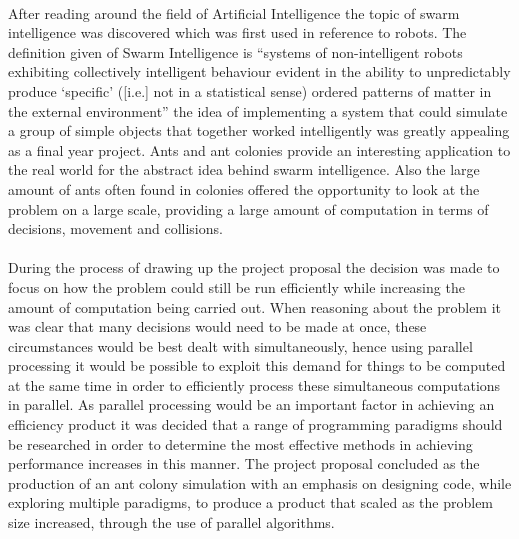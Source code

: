 \documentclass[main.tex]{subfiles}
\begin{document}
\paragraph{}After reading around the field of Artificial Intelligence the topic of swarm intelligence was discovered which was first used in reference to robots. The definition given of Swarm Intelligence is ``systems of non-intelligent robots exhibiting collectively intelligent behaviour evident in the ability to unpredictably produce `specific' ([i.e.] not in a statistical sense) ordered patterns of matter in the external environment''\cite{Beni1989} the idea of implementing a system that could simulate a group of simple objects that together worked intelligently was greatly appealing as a final year project. Ants and ant colonies provide an interesting application to the real world for the abstract idea behind swarm intelligence. Also the large amount of ants often found in colonies offered the opportunity to look at the problem on a large scale, providing a large amount of computation in terms of decisions, movement and collisions.

\paragraph{}During the process of drawing up the project proposal the decision was made to focus on how the problem could still be run efficiently while increasing the amount of computation being carried out. When reasoning about the problem it was clear that many decisions would need to be made at once, these circumstances would be best dealt with simultaneously, hence using parallel processing it would be possible to exploit this demand for things to be computed at the same time in order to efficiently process these simultaneous computations in parallel. As parallel processing would be an important factor in achieving an efficiency product it was decided that a range of programming paradigms should be researched in order to determine the most effective methods in achieving performance increases in this manner. The project proposal concluded as the production of an ant colony simulation with an emphasis on designing code, while exploring multiple paradigms, to produce a product that scaled as the problem size increased, through the use of parallel algorithms.

\end{document}
